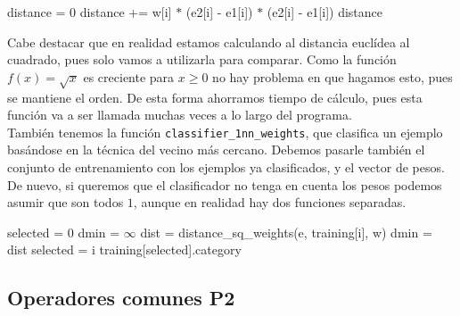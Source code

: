 \documentclass[12pt]{article}
\begin{document}
\begin{algorithm}[ht!]
\begin{algorithmic}

     \State distance = $0$
       
            \State distance += w[i] $\ast$ (e2[i] - e1[i]) $\ast$ (e2[i] - e1[i])
         \EndIf
     \EndFor
     \State \Return distance
\EndFunction

\end{algorithmic}
\end{algorithm}

Cabe destacar que en realidad estamos calculando al distancia euclídea al cuadrado, pues solo vamos a utilizarla para comparar. Como la función $f(x)=\sqrt{x}$ es creciente para $x\geq 0$ no hay problema en que hagamos esto, pues se mantiene el orden. De esta forma ahorramos tiempo de cálculo, pues esta función va a ser llamada muchas veces a lo largo del programa.\\

También tenemos la función \verb|classifier_1nn_weights|, que clasifica un ejemplo basándose en la técnica del vecino más cercano. Debemos pasarle también el conjunto de entrenamiento con los ejemplos ya clasificados, y el vector de pesos. De nuevo, si queremos que el clasificador no tenga en cuenta los pesos podemos asumir que son todos $1$, aunque en realidad hay dos funciones separadas.

\begin{algorithm}[h]
\begin{algorithmic}

     \State selected = $0$
     \State dmin = $\infty$
       
            \State dist = distance\_sq\_weights(e, training[i], w)
                \State dmin = dist
                \State selected = i
            \EndIf
         \EndIf
     \EndFor
     \State \Return training[selected].category
\EndFunction

\end{algorithmic}
\end{algorithm}

\subsection*{Operadores comunes P2}
\label{op_comunes}
\end{document}
